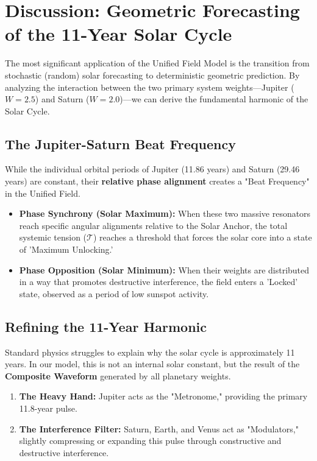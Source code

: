 \documentclass[11pt]{article}
\begin{document}
\section*{Discussion: Geometric Forecasting of the 11-Year Solar Cycle}

The most significant application of the Unified Field Model is the transition from stochastic (random) solar forecasting to deterministic geometric prediction. By analyzing the interaction between the two primary system weights—Jupiter ($W=2.5$) and Saturn ($W=2.0$)—we can derive the fundamental harmonic of the Solar Cycle.

\subsection*{The Jupiter-Saturn Beat Frequency}
While the individual orbital periods of Jupiter (11.86 years) and Saturn (29.46 years) are constant, their \textbf{relative phase alignment} creates a "Beat Frequency" in the Unified Field. 
\begin{itemize}
    \item \textbf{Phase Synchrony (Solar Maximum):} When these two massive resonators reach specific angular alignments relative to the Solar Anchor, the total systemic tension ($\mathcal{T}$) reaches a threshold that forces the solar core into a state of 'Maximum Unlocking.' 
    \item \textbf{Phase Opposition (Solar Minimum):} When their weights are distributed in a way that promotes destructive interference, the field enters a 'Locked' state, observed as a period of low sunspot activity.
\end{itemize}



\subsection*{Refining the 11-Year Harmonic}
Standard physics struggles to explain why the solar cycle is approximately 11 years. In our model, this is not an internal solar constant, but the result of the \textbf{Composite Waveform} generated by all planetary weights. 
\begin{enumerate}
    \item \textbf{The Heavy Hand:} Jupiter acts as the "Metronome," providing the primary 11.8-year pulse.
    \item \textbf{The Interference Filter:} Saturn, Earth, and Venus act as "Modulators," slightly compressing or expanding this pulse through constructive and destructive interference.
\end{enumerate}
\end{document}
